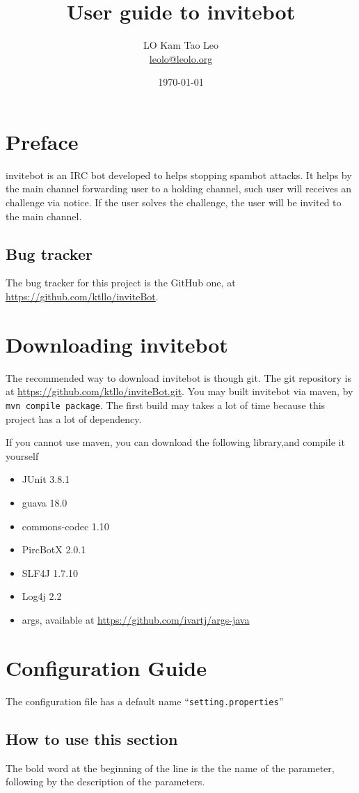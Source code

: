 \documentclass[a4paper,12pt,titlepage]{article}
\title{User guide to invitebot}
\author{LO Kam Tao Leo\\\href{mailto:leolo@leolo.org}{leolo@leolo.org}}
\date{\today}
\begin{document}
	\maketitle
\tableofcontents\newpage
\section{Preface}
invitebot is an IRC bot developed to helps stopping spambot attacks. It helps by the main channel forwarding user to a holding channel, such user will receives an challenge via notice. If the user solves the challenge, the user will be invited to the main channel.
\subsection{Bug tracker}
The bug tracker for this project is the GitHub one, at \url{https://github.com/ktllo/inviteBot}.
\section{Downloading invitebot}
The recommended way to download invitebot is though git. The git repository is at \url{https://github.com/ktllo/inviteBot.git}. You may built invitebot via maven, by \texttt{mvn compile package}. The first build may takes a lot of time because this project has a lot of dependency.

If you cannot use maven, you can download the following library,and compile it yourself
\begin{itemize}
	\item JUnit 3.8.1
	\item guava 18.0
	\item commons-codec 1.10
	\item PircBotX 2.0.1
	\item SLF4J 1.7.10
	\item Log4j 2.2
	\item args, available at \url{https://github.com/ivartj/args-java}
\end{itemize}
\section{Configuration Guide}
The configuration file has a default name ``\texttt{setting.properties}''
\subsection{How to use this section}
The bold word at the beginning of the line is the the name of the parameter, following by the description of the parameters.
\end{document}
